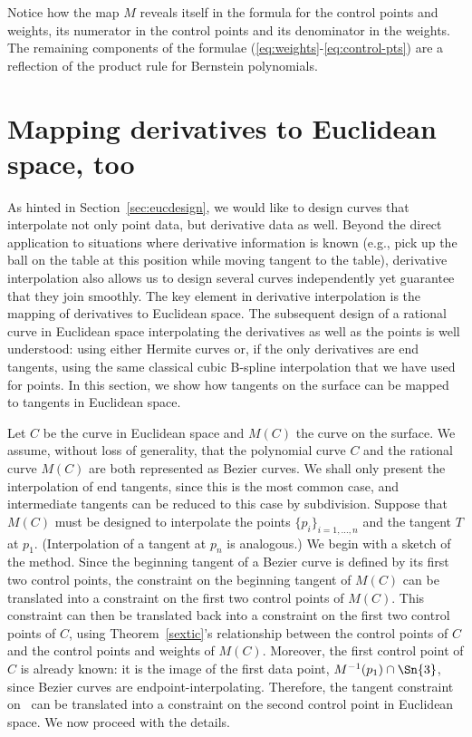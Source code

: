 Notice how the map $M$ reveals itself in the formula for the control points
and weights, its numerator in the control points and its denominator
in the weights.
The remaining components of the formulae (\ref{eq:weights}-\ref{eq:control-pts})
are a reflection of the product rule for Bernstein polynomials.

\section{Mapping derivatives to Euclidean space, too}
\label{sec:derivative}

As hinted in Section~\ref{sec:eucdesign}, 
we would like to design curves that interpolate not only point data,
but derivative data as well.
Beyond the direct application to situations where derivative information
is known (e.g., pick up the ball on the table at this position while
moving tangent to the table), 
derivative interpolation also allows us to design several curves 
independently yet guarantee that they join smoothly.
The key element in derivative interpolation is the mapping of derivatives
to Euclidean space.
The subsequent design of a rational curve in Euclidean space
interpolating the derivatives as well as the points
is well understood: using either Hermite curves or, if the only derivatives
are end tangents, using the same classical cubic B-spline interpolation that
we have used for points.
In this section, we show how tangents on the surface can be mapped
to tangents in Euclidean space.

Let $C$ be the curve in Euclidean space and $M(C)$ the curve on the surface.
We assume, without loss of generality, that the polynomial curve $C$
and the rational curve $M(C)$ are both represented as Bezier curves.
We shall only present the interpolation of end tangents,
since this is the most common case, and intermediate tangents can be
reduced to this case by subdivision.
Suppose that $M(C)$ must be designed to interpolate the points 
$\{p_i\}_{i=1,\ldots,n}$ and the tangent $T$ at $p_1$.
(Interpolation of a tangent at $p_n$ is analogous.)
We begin with a sketch of the method.
Since the beginning tangent of a Bezier curve is defined by its first 
two control points, the constraint on the beginning tangent of $M(C)$ can be
translated into a constraint on the first two control points of $M(C)$.
This constraint can then be translated back into a constraint
on the first two control points of $C$, using Theorem~\ref{sextic}'s
relationship between the control points of $C$ 
and the control points and weights of $M(C)$.
Moreover, the first control point of $C$ is already known:
it is the image of the first data point, $M^{-1}(p_1) \cap \Sn{3}$,
since Bezier curves are endpoint-interpolating.
Therefore, the tangent constraint on \ can be translated
into a constraint on the second control point in Euclidean space.
We now proceed with the details.


